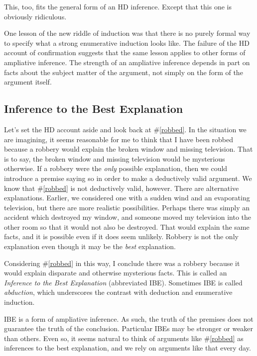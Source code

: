 \documentclass[]{article}
\begin{document}
This, too, fits the general form of an HD inference. Except that this one is obviously ridiculous.

One lesson of the new riddle of induction was that there is no purely formal way to specify what a strong enumerative induction looks like. The failure of the HD account of confirmation suggests that the same lesson applies to other forms of ampliative inference. The strength of an ampliative inference depends in part on facts about the subject matter of the argument, not simply on the form of the argument itself.

\subsection{Inference to the Best Explanation}

Let's set the HD account aside and look back at \#\ref{robbed}. In the situation we are imagining, it seems reasonable for me to think that I have been robbed because a robbery would explain the broken window and missing television. That is to say, the broken window and missing television would be mysterious otherwise. If a robbery were the \emph{only} possible explanation, then we could introduce a premise saying so in order to make a deductively valid argument. We know that \#\ref{robbed} is not deductively valid, however. There are alternative explanations. Earlier, we considered one with a sudden wind and an evaporating television, but there are more realistic possibilities. Perhaps there was simply an accident which destroyed my window, and someone moved my television into the other room so that it would not also be destroyed. That would explain the same facts, and it is possible even if it does seem unlikely. Robbery is not the only explanation even though it may be the \emph{best} explanation.

Considering \#\ref{robbed} in this way, I conclude there was a robbery because it would explain disparate and otherwise mysterious facts. This is called an \emph{Inference to the Best Explanation} (abbreviated IBE). Sometimes IBE is called \emph{abduction}, which underscores the contrast with deduction and enumerative induction.

IBE is a form of ampliative inference. As such, the truth of the premises does not guarantee the truth of the conclusion. Particular IBEs may be stronger or weaker than others. Even so, it seems natural to think of arguments like \#\ref{robbed} as inferences to the best explanation, and we rely on arguments like that every day. 
\end{document}
